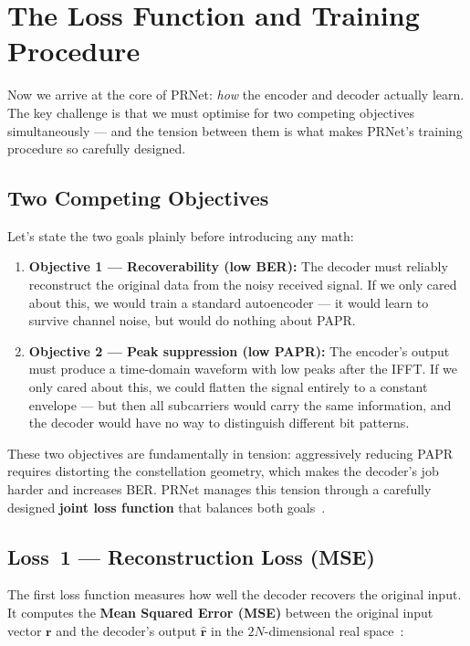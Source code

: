 \section{The Loss Function and Training Procedure}

Now we arrive at the core of PRNet: \emph{how} the encoder and decoder actually learn.  The key challenge is that we must optimise for two competing objectives simultaneously --- and the tension between them is what makes PRNet's training procedure so carefully designed.

\subsection{Two Competing Objectives}

Let's state the two goals plainly before introducing any math:

\begin{enumerate}
    \item \textbf{Objective 1 --- Recoverability (low BER):} The decoder must reliably reconstruct the original data from the noisy received signal.  If we only cared about this, we would train a standard autoencoder --- it would learn to survive channel noise, but would do nothing about PAPR.
    \item \textbf{Objective 2 --- Peak suppression (low PAPR):} The encoder's output must produce a time-domain waveform with low peaks after the IFFT.  If we only cared about this, we could flatten the signal entirely to a constant envelope --- but then all subcarriers would carry the same information, and the decoder would have no way to distinguish different bit patterns.
\end{enumerate}

These two objectives are fundamentally in tension: aggressively reducing PAPR requires distorting the constellation geometry, which makes the decoder's job harder and increases BER.  PRNet manages this tension through a carefully designed \textbf{joint loss function} that balances both goals~\cite{kim2017novel}.

\subsection{Loss~1 --- Reconstruction Loss (MSE)}

The first loss function measures how well the decoder recovers the original input.  It computes the \textbf{Mean Squared Error (MSE)} between the original input vector $\bm{r}$ and the decoder's output $\hat{\bm{r}}$ in the $2N$-dimensional real space~\cite{kim2017novel}:

